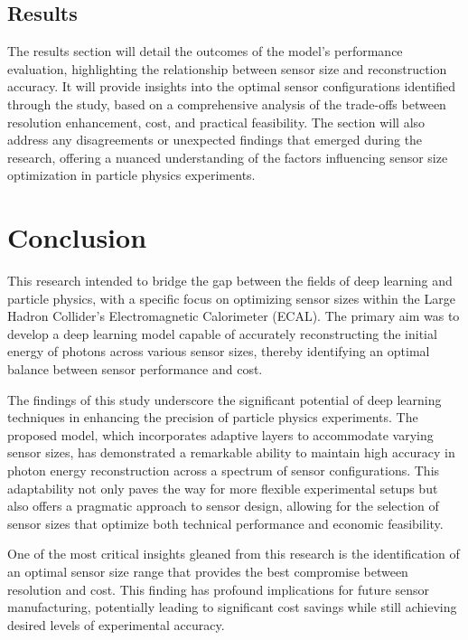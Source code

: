 \documentclass[conference]{IEEEtran}
\begin{document}
\subsection{Results}
\label{main_body:results}

The results section will detail the outcomes of the model's performance evaluation, highlighting the relationship between sensor size and reconstruction accuracy. It will provide insights into the optimal sensor configurations identified through the study, based on a comprehensive analysis of the trade-offs between resolution enhancement, cost, and practical feasibility. The section will also address any disagreements or unexpected findings that emerged during the research, offering a nuanced understanding of the factors influencing sensor size optimization in particle physics experiments.

\section{Conclusion}
\label{conclusion}

This research intended to bridge the gap between the fields of deep learning and particle physics, with a specific focus on optimizing sensor sizes within the Large Hadron Collider's Electromagnetic Calorimeter (ECAL). The primary aim was to develop a deep learning model capable of accurately reconstructing the initial energy of photons across various sensor sizes, thereby identifying an optimal balance between sensor performance and cost.

The findings of this study underscore the significant potential of deep learning techniques in enhancing the precision of particle physics experiments. The proposed model, which incorporates adaptive layers to accommodate varying sensor sizes, has demonstrated a remarkable ability to maintain high accuracy in photon energy reconstruction across a spectrum of sensor configurations. This adaptability not only paves the way for more flexible experimental setups but also offers a pragmatic approach to sensor design, allowing for the selection of sensor sizes that optimize both technical performance and economic feasibility.

One of the most critical insights gleaned from this research is the identification of an optimal sensor size range that provides the best compromise between resolution and cost. This finding has profound implications for future sensor manufacturing, potentially leading to significant cost savings while still achieving desired levels of experimental accuracy.
\end{document}
